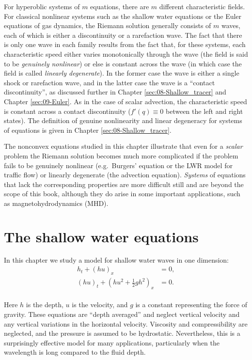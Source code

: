 \documentclass{SIAMbook2016}
\begin{document}
For hyperoblic systems of \(m\) equations, there are \(m\) different
characteristic fields. For classical nonlinear systems such as the
shallow water equations or the Euler equations of gas dynamics, the
Riemann solution generally consists of \(m\) waves, each of which is
either a discontinuity or a rarefaction wave. The fact that there is
only one wave in each family results from the fact that, for these
systems, each characteristic speed either varies monotonically through
the wave (the field is said to be \emph{genuinely nonlinear}) or else is
constant across the wave (in which case the field is called
\emph{linearly degenerate}). In the former case the wave is either a
single shock or rarefaction wave, and in the latter case the wave is a
``contact discontinuity'', as discussed further in
Chapter \ref{sec:08-Shallow_tracer} and Chapter \ref{sec:09-Euler}. As
in the case of scalar advection, the characteristic speed is constant
across a contact discontinuity (\(f'(q) \equiv 0\) between the left and
right states). The definition of genuine nonlinearity and linear
degeneracy for systems of equations is given in
Chapter \ref{sec:08-Shallow_tracer}.

The nonconvex equations studied in this chapter illustrate that even for
a \emph{scalar} problem the Riemann solution becomes much more
complicated if the problem fails to be genuinely nonlinear
(e.g.~Burgers' equation or the LWR model for traffic flow) or linearly
degenerate (the advection equation). \emph{Systems} of equations that
lack the corresponding properties are more difficult still and are
beyond the scope of this book, although they do arise in some important
applications, such as magnetohydrodynamics (MHD).

\hypertarget{the-shallow-water-equations}{%
\chapter{The shallow water
equations}\label{the-shallow-water-equations}}
\label{sec:07-Shallow_water}
In this chapter we study a model for shallow water waves in one
dimension:\\
\begin{align}
    h_t + (hu)_x & = 0, \label{SW_mass} \\
    (hu)_t + \left(hu^2 + \frac{1}{2}gh^2\right)_x & = 0. \label{SW_mom}
\end{align}\\
Here \(h\) is the depth, \(u\) is the velocity, and \(g\) is a constant
representing the force of gravity. These equations are ``depth
averaged'' and neglect vertical velocity and any vertical variations in
the horizontal velocity. Viscosity and compressibility are neglected,
and the pressure is assumed to be hydrostatic. Nevertheless, this is a
surprisingly effective model for many applications, particularly when
the wavelength is long compared to the fluid depth.
\end{document}
